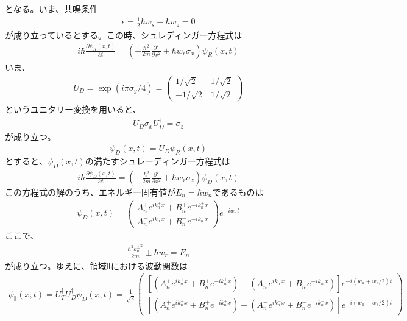 となる。いま、共鳴条件
\begin{align}
{\epsilon}=\frac{1}{2}{\hbar}w_{s}-{\hbar}w_{z}=0
\end{align}
が成り立っているとする。この時、シュレディンガー方程式は
\begin{align}
i{\hbar}\frac{\partial {\psi}_{R}(x,t)}{\partial t}=\left(-\frac{\hbar^2}{2m}\frac{\partial^2}{\partial x^2}+{\hbar}w_{r}{\sigma}_{x}\right){\psi}_{R}(x,t)
\end{align}
いま、
\begin{align}
U_{D}=\exp(i{\pi}{\sigma}_{y}/4)=
\begin{pmatrix}
1/\sqrt{2} &1/\sqrt{2} \\
-1/\sqrt{2} &1/\sqrt{2}
\end{pmatrix}
\end{align}
というユニタリー変換を用いると、
\begin{align}
U_{D}{\sigma}_{x}U_{D}^{\dagger}={\sigma}_{z}
\end{align}
が成り立つ。
\begin{align}
{\psi}_{D}(x,t)=U_{D}{\psi}_{R}(x,t)
\end{align}
$とすると、{\psi}_{D}(x,t)の満たすシュレーディンガー方程式は$
\begin{align}
i{\hbar}\frac{\partial {\psi}_{D}(x,t)}{\partial t}=\left(-\frac{\hbar^2}{2m}\frac{\partial^2}{\partial x^2}+{\hbar}w_{r}{\sigma}_{z}\right){\psi}_{D}(x,t)
\end{align}
$この方程式の解のうち、エネルギー固有値がE_{n}={\hbar}w_{n}であるものは$
\begin{align}
{\psi}_{D}(x,t) =
\begin{pmatrix}
A_{n}^{+}e^{ik_{n}^{+}x}+B_{n}^{+}e^{-ik_{n}^{+}x}  \\
A_{n}^{-}e^{ik_{n}^{-}x}+B_{n}^{-}e^{-ik_{n}^{-}x}
\end{pmatrix}
e^{-iw_{n}t}
\end{align}
ここで、
\begin{align}
\frac{{{\hbar}^2}{k_{n}^{\pm}}^2}{2m}{\pm}{\hbar}w_{r}=E_{n}
\end{align}
が成り立つ。ゆえに、領域Ⅱにおける波動関数は
\begin{align}
{\psi}_{Ⅱ}(x,t)=U_{T}^{\dagger}U_{D}^{\dagger}{\psi}_{D}(x,t)=\frac{1}{\sqrt{2}}
\begin{pmatrix}
\left[(A_{n}^{+}e^{ik_{n}^{+}x}+B_{n}^{+}e^{-ik_{n}^{+}x})+(A_{n}^{-}e^{ik_{n}^{-}x}+B_{n}^{-}e^{-ik_{n}^{-}x})\right]e^{-i(w_{n}+w_{s}/2)t} \\
\left[(A_{n}^{+}e^{ik_{n}^{+}x}+B_{n}^{+}e^{-ik_{n}^{+}x})-(A_{n}^{-}e^{ik_{n}^{-}x}+B_{n}^{-}e^{-ik_{n}^{-}x})\right]e^{-i(w_{n}-w_{s}/2)t}
\end{pmatrix}
\end{align}

